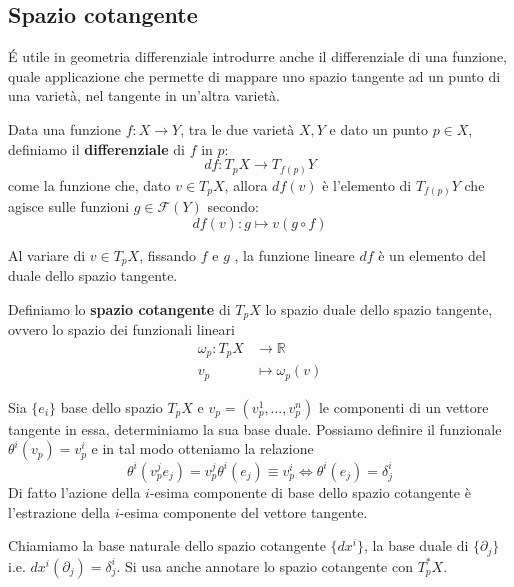 \subsection{Spazio cotangente}
\'E utile in geometria differenziale introdurre anche il differenziale di una funzione, quale applicazione che permette di mappare uno spazio tangente ad un punto di una varietà, nel tangente in un'altra varietà.
\begin{definizione}
    Data una funzione $f: X \rightarrow Y$, tra le due varietà $X, Y$ e dato un punto $p \in X$, definiamo il \textbf{differenziale} di $f$ in $p$:
\begin{equation}
        df: T_pX \rightarrow T_{f(p)}Y
        \label{eq.differenziale}
\end{equation}
come la funzione che, dato $v \in T_pX$, allora $df(v)$ è l'elemento di $T_{f(p)}Y$ che agisce sulle funzioni $g\in\mathcal{F}(Y)$ secondo:
\begin{equation*}
    df(v): g \mapsto v(g\circ f)
\end{equation*}
\end{definizione}
Al variare di $v \in T_pX$, fissando $f$ e $g$ , la funzione lineare $df$ è un elemento del duale dello spazio tangente.

\begin{definizione}
Definiamo lo \textbf{spazio cotangente} di $T_pX$ lo spazio duale dello spazio tangente, ovvero lo spazio dei funzionali lineari
\begin{align*}
    \omega_p : T_pX &\rightarrow \mathbb{R}\\
    v_p &\mapsto \omega_p(v)
\end{align*}
\end{definizione}

Sia $\{e_i\}$ base dello spazio $T_pX$ e $v_p=(v_p^1, \dots, v_p^n)$ le componenti di un vettore tangente in essa, determiniamo la sua base duale. Possiamo definire il funzionale $\theta^i(v_p)=v_p^i$ e in tal modo otteniamo la relazione
\begin{equation*}
    \theta^i(v_p^je_j) = v_p^j\theta^i(e_j) \equiv v_p^i \iff \theta^i(e_j)= \delta^i_j
\end{equation*}
Di fatto l'azione della $i$-esima componente di base dello spazio cotangente è l'estrazione della $i$-esima componente del vettore tangente.

Chiamiamo la base naturale dello spazio cotangente $\{dx^i\}$, la base duale di $\{\partial_j\}$ i.e. $dx^i(\partial_j)=\delta^i_j$. Si usa anche annotare lo spazio cotangente con $T_p^*X$.

